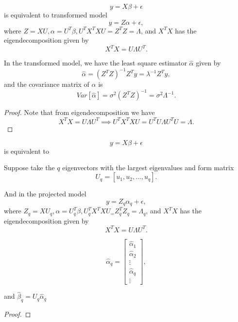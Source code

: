 \begin{refsection}
\begin{lemma}\cite[355]{montgomery2012introduction}
	$$y = X\beta + \epsilon$$
is equivalent to transformed model
$$y = Z\alpha + \epsilon,$$
where $Z = XU, \alpha = U^T\beta, U^TX^TXU = Z^TZ = \Lambda$, and $X^TX$ has the eigendecomposition given by
$$X^TX = U\Lambda U^T.$$	
	
In the transformed model, we have the least square estimator $\hat{\alpha}$ given by
$$\hat{\alpha}=(Z^TZ)^{-1}Z^Ty = \lambda^{-1}Z^Ty,$$
and the covariance matrix of $\hat{\alpha}$ is
$$Var[\hat{\alpha}] = \sigma^2(Z^TZ)^{-1} = \sigma^2 \Lambda^{-1}.$$
	
\end{lemma}
\begin{proof}
Note that from eigendecomposition we have
$$X^TX = U\Lambda U^T \implies U^TX^TXU = U^TU\Lambda U^TU = \Lambda.$$	
\end{proof}

\begin{remark}

\end{remark}



\begin{lemma}\cite[355]{montgomery2012introduction}
	$$y = X\beta + \epsilon$$
	is equivalent to

	
	Suppose take the $q$ eigenvectors with the largest eigenvalues and form matrix	$$U_q = [u_1,u_2,...,u_q].$$
	
	And in the projected model
		$$y = Z_q\alpha_q + \epsilon,$$
	where $Z_q = XU_q, \alpha = U^T_q\beta, U^T_qX^TXU_ = Z^T_qZ_q = \Lambda_q$, and $X^TX$ has the eigendecomposition given by
	$$X^TX = U\Lambda U^T.$$	
	
	
	$$\hat{\alpha}_q = \begin{bmatrix}
	\hat{\alpha}_1\\
	\hat{\alpha}_2\\
	\vdots \\
	\hat{\alpha}_q\\
	\vdots
	\end{bmatrix},$$
	
	and $\hat{\beta}_q = U_q \hat{\alpha}_q$
\end{lemma}
\begin{proof}
	
\end{proof}



\end{refsection}
